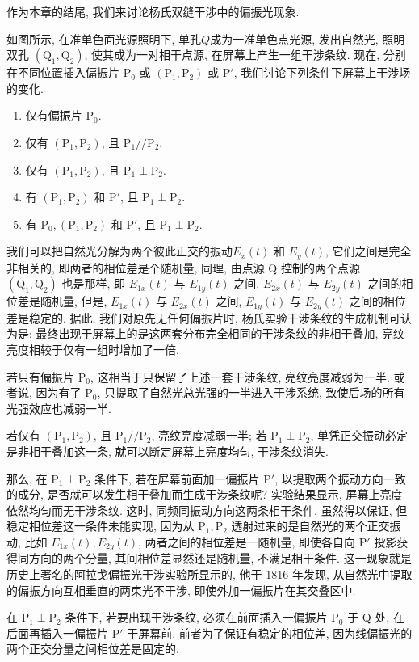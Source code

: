 作为本章的结尾, 我们来讨论杨氏双缝干涉中的偏振光现象.


如图所示, 在准单色面光源照明下, 单孔$Q$成为一准单色点光源, 发出自然光, 照明双孔 $(\text{Q}_1, \text{Q}_2)$, 使其成为一对相干点源, 在屏幕上产生一组干涉条纹. 现在, 分别在不同位置插入偏振片 $\text{P}_0$ 或 $(\text{P}_1, \text{P}_2)$ 或 $\text{P}'$, 我们讨论下列条件下屏幕上干涉场的变化.

\begin{enumerate}
    \item [(1)] 仅有偏振片 $\text{P}_0$.
    \item [(2)] 仅有 $(\text{P}_1, \text{P}_2)$, 且 $\text{P}_1 // \text{P}_2$.
    \item [(3)] 仅有 $(\text{P}_1, \text{P}_2)$, 且 $\text{P}_1 \perp \text{P}_2$.
    \item [(4)] 有 $(\text{P}_1, \text{P}_2)$ 和 $\text{P}'$, 且 $\text{P}_1 \perp \text{P}_2$.
    \item [(5)] 有 $\text{P}_0, (\text{P}_1, \text{P}_2)$ 和 $\text{P}'$, 且 $\text{P}_1 \perp \text{P}_2$.
\end{enumerate}

我们可以把自然光分解为两个彼此正交的振动$E_x(t)$ 和 $E_y(t)$, 它们之间是完全非相关的, 即两者的相位差是个随机量, 同理, 由点源 Q 控制的两个点源 $(\text{Q}_1, \text{Q}_2)$ 也是那样, 即 $E_{1x}(t)$ 与 $E_{1y}(t)$ 之间, $E_{2x}(t)$ 与 $E_{2y}(t)$ 之间的相位差是随机量, 但是, $E_{1x}(t)$ 与 $E_{2x}(t)$ 之间, $E_{1y}(t)$ 与 $E_{2y}(t)$ 之间的相位差是稳定的. 据此, 我们对原先无任何偏振片时, 杨氏实验干涉条纹的生成机制可认为是: 最终出现于屏幕上的是这两套分布完全相同的干涉条纹的非相干叠加, 亮纹亮度相较于仅有一组时增加了一倍.

若只有偏振片 $\text{P}_0$, 这相当于只保留了上述一套干涉条纹, 亮纹亮度减弱为一半. 或者说, 因为有了 $\text{P}_0$, 只提取了自然光总光强的一半进入干涉系统, 致使后场的所有光强效应也减弱一半.

若仅有 $(\text{P}_1, \text{P}_2)$, 且 $\text{P}_1 // \text{P}_2$, 亮纹亮度减弱一半; 若 $\text{P}_1 \perp \text{P}_2$, 单凭正交振动必定是非相干叠加这一条, 就可以断定屏幕上亮度均匀, 干涉条纹消失.

那么, 在 $\text{P}_1 \perp \text{P}_2$ 条件下, 若在屏幕前面加一偏振片 $\text{P}'$, 以提取两个振动方向一致的成分, 是否就可以发生相干叠加而生成干涉条纹呢? 实验结果显示, 屏幕上亮度依然均匀而无干涉条纹. 这时, 同频同振动方向这两条相干条件, 虽然得以保证, 但稳定相位差这一条件未能实现, 因为从 $\text{P}_1, \text{P}_2$ 透射过来的是自然光的两个正交振动, 比如 $E_{1x}(t), E_{2y}(t)$, 两者之间的相位差是一随机量, 即使各自向 $\text{P}'$ 投影获得同方向的两个分量, 其间相位差显然还是随机量, 不满足相干条件. 这一现象就是历史上著名的阿拉戈偏振光干涉实验所显示的, 他于 1816 年发现, 从自然光中提取的偏振方向互相垂直的两束光不干涉, 即使外加一偏振片在其交叠区中.

在 $\text{P}_1 \perp \text{P}_2$ 条件下, 若要出现干涉条纹, 必须在前面插入一偏振片 $\text{P}_0$ 于 Q 处, 在后面再插入一偏振片 $\text{P}'$ 于屏幕前. 前者为了保证有稳定的相位差, 因为线偏振光的两个正交分量之间相位差是固定的.

